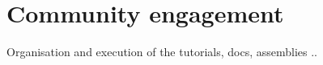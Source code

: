 \section{Community engagement} \label{sec:cet}

Organisation and execution of the tutorials, docs, assemblies ..
